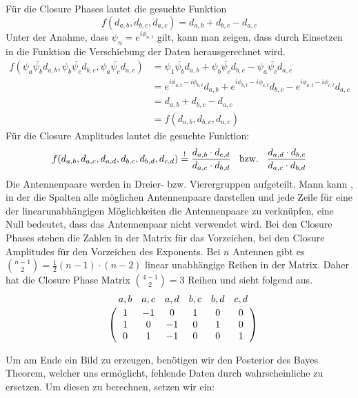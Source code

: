 \documentclass[]{dsadokumentation}
\begin{document}
Für die Closure Phases lautet die gesuchte Funktion
\begin{equation}f(d_{a,b},d_{b,c},d_{a,c})=d_{a,b}+d_{b,c}-d_{a,c}\end{equation}
Unter der Anahme, dass $\psi_n = e^{i \phi_{n,t}}$ gilt, kann man zeigen, dass durch Einsetzen in die Funktion die Verschiebung der Daten herausgerechnet wird.
\begin{align}
f(\psi_a\bar{\psi_b} d_{a,b},\psi_b\bar{\psi_c}d_{b,c},\psi_a \bar{\psi_c} d_{a,c})&=\psi_1\bar{\psi_b}d_{a,b}+\psi_b\bar{\psi_c}d_{b,c}-\psi_a \bar{\psi_c} d_{a,c}\\
&=e^{i \phi_{a,t}-i\phi_{b,t}}d_{a,b}+e^{i \phi_{b,t}-i\phi_{c,t}}d_{b,c}-e^{i \phi_{a,t}-i\phi_{c,t}}d_{a,c}\\
&=d_{a,b}+d_{b,c}-d_{a,c}\\
&=f(d_{a,b},d_{b,c},d_{a,c})
\end{align}
Für die Closure Amplitudes lautet die gesuchte Funktion:
\begin{align}
f(d_{a, b},d_{a, c},d_{a, d},d_{b, c},d_{b, d},d_{c, d})\overset{!}{=}\frac{d_{a,b}\cdot d_{c,d}}{d_{a,c} \cdot d_{b,d}}
\hspace{3mm}\text{bzw.}\hspace{3mm} \frac{d_{a,d}\cdot d_{b,c}}{d_{a,c} \cdot d_{b,d}}
\end{align}
Die Antennenpaare werden in Dreier- bzw. Vierergruppen aufgeteilt. Mann kann , in der die Spalten alle möglichen Antennenpaare darstellen und jede Zeile für eine der linearunabhängigen Möglichkeiten die Antennenpaare zu verknüpfen, eine Null bedeutet, dass das Antennenpaar nicht verwendet wird. Bei den Closure Phases stehen die Zahlen in der Matrix für das Vorzeichen, bei den Closure Amplitudes für den Vorzeichen des Exponents. Bei $n$ Antennen gibt es $\binom{n-1}{2}= \frac{1}{2}(n-1)\cdot(n-2)$ linear unabhängige Reihen in der Matrix.
Daher hat die Closure Phase Matrix $\binom{4-1}{2}=3$ Reihen und sieht folgend aus.
\begin{equation}
\bordermatrix{
~ &a,b&a,c&a,d&b,c&b,d&c,d\cr
~&1&-1&0&1&0&0 \cr
~&1&0&-1&0&1&0 \cr
~&0&1&-1&0&0&1 \cr}
\end{equation}

Um am Ende ein Bild zu erzeugen, benötigen wir den Posterior des Bayes Theorem, welcher uns ermöglicht, fehlende Daten durch wahrscheinliche zu ersetzen. Um diesen zu berechnen, setzen wir ein:
\end{document}
